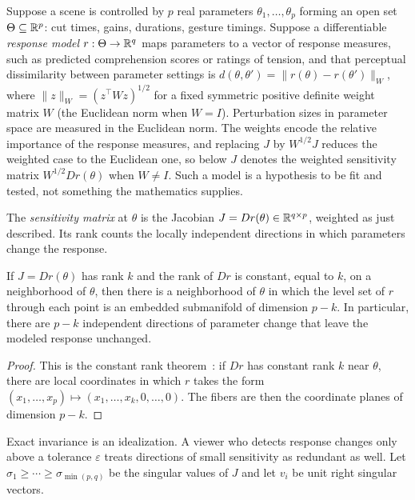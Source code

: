 Suppose a scene is controlled by $p$ real parameters $\theta_1,\dots,\theta_p$ forming an open set $\Theta\subseteq\mathbb{R}^p$: cut times, gains, durations, gesture timings. Suppose a differentiable \emph{response model} $r:\Theta\to\mathbb{R}^q$ maps parameters to a vector of response measures, such as predicted comprehension scores or ratings of tension, and that perceptual dissimilarity between parameter settings is $d(\theta,\theta')=\lVert r(\theta)-r(\theta')\rVert_W$, where $\lVert z\rVert_W=(z^{\top}Wz)^{1/2}$ for a fixed symmetric positive definite weight matrix $W$ (the Euclidean norm when $W=I$). Perturbation sizes in parameter space are measured in the Euclidean norm. The weights encode the relative importance of the response measures, and replacing $J$ by $W^{1/2}J$ reduces the weighted case to the Euclidean one, so below $J$ denotes the weighted sensitivity matrix $W^{1/2}Dr(\theta)$ when $W\neq I$. Such a model is a hypothesis to be fit and tested, not something the mathematics supplies.

The \emph{sensitivity matrix} at $\theta$ is the Jacobian $J=Dr(\theta)\in\mathbb{R}^{q\times p}$, weighted as just described. Its rank counts the locally independent directions in which parameters change the response.

\begin{proposition}\label{prop:redundant}
If $J=Dr(\theta)$ has rank $k$ and the rank of $Dr$ is constant, equal to $k$, on a neighborhood of $\theta$, then there is a neighborhood of $\theta$ in which the level set of $r$ through each point is an embedded submanifold of dimension $p-k$. In particular, there are $p-k$ independent directions of parameter change that leave the modeled response unchanged.
\end{proposition}

\begin{proof}
This is the constant rank theorem~\cite{lee2013}: if $Dr$ has constant rank $k$ near $\theta$, there are local coordinates in which $r$ takes the form $(x_1,\dots,x_p)\mapsto(x_1,\dots,x_k,0,\dots,0)$. The fibers are then the coordinate planes of dimension $p-k$.
\end{proof}

Exact invariance is an idealization. A viewer who detects response changes only above a tolerance $\varepsilon$ treats directions of small sensitivity as redundant as well. Let $\sigma_1\ge\cdots\ge\sigma_{\min(p,q)}$ be the singular values of $J$ and let $v_i$ be unit right singular vectors.

